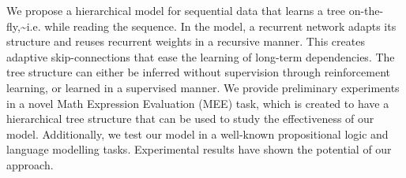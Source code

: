 We propose a hierarchical model for sequential data that learns a tree on-the-fly,{\textasciitilde}i.e. while reading the sequence. In the model, a recurrent network adapts its structure and reuses recurrent weights in a recursive manner. This creates adaptive skip-connections that ease the learning of long-term dependencies. The tree structure can either be inferred without supervision through reinforcement learning, or learned in a supervised manner. We provide preliminary experiments in a novel Math Expression Evaluation (MEE) task, which is created to have a hierarchical tree structure that can be used to study the effectiveness of our model. Additionally, we test our model in a well-known propositional logic and language modelling tasks. Experimental results have shown the potential of our approach.
